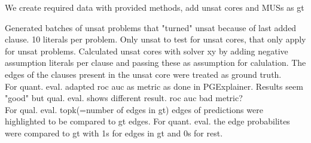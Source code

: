 We create required data with provided methods, add unsat cores and MUSs as gt


Generated batches of unsat problems that "turned" unsat because of last added clause. 10 literals per problem. Only unsat to test for unsat cores, that only apply for unsat problems. Calculated unsat cores with solver xy by adding negative assumption literals per clause and passing these as assumption for calulation. The edges of the clauses present in the unsat core were treated as ground truth. \\


For quant. eval. adapted roc auc as metric as done in PGExplainer. Results seem "good" but qual. eval. shows different result. roc auc bad metric? \\
For qual. eval. topk(=number of edges in gt) edges of predictions were highlighted to be compared to gt edges. For quant. eval. the edge probabilites were compared to gt with 1s for edges in gt and 0s for rest. \\


